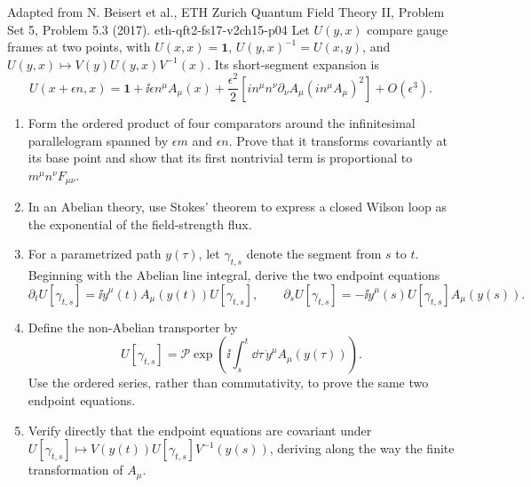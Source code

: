 \begin{enumerate}
  {Adapted from N. Beisert et al., ETH Zurich Quantum Field Theory II, Problem Set 5, Problem 5.3 (2017).}
  {eth-qft2-fs17-v2ch15-p04}
  Let \(U(y,x)\) compare gauge frames at two points, with
  \(U(x,x)=\mathbf{1}\), \(U(y,x)^{-1}=U(x,y)\), and
  \(U(y,x)\mapsto V(y)U(y,x)V^{-1}(x)\).  Its short-segment expansion is
  \[
    U(x+\epsilon n,x)=\mathbf{1}+\ii\epsilon n^\mu A_\mu(x)
      +\frac{\epsilon^2}{2}
       \left[in^\mu n^\nu\partial_\nu A_\mu
             (in^\mu A_\mu)^2\right]+O(\epsilon^3).
  \]
  \begin{enumerate}
    \item[(a)] Form the ordered product of four comparators around the
      infinitesimal parallelogram spanned by \(\epsilon m\) and
      \(\epsilon n\).  Prove that it transforms covariantly at its base
      point and show that its first nontrivial term is proportional to
      \(m^\mu n^\nu F_{\mu\nu}\).
    \item[(b)] In an Abelian theory, use Stokes' theorem to express a closed
      Wilson loop as the exponential of the field-strength flux.
    \item[(c)] For a parametrized path \(y(\tau)\), let
      \(\gamma_{t,s}\) denote the segment from \(s\) to \(t\).  Beginning
      with the Abelian line integral, derive the two endpoint equations
      \[
        \partial_tU[\gamma_{t,s}]
          =\ii\dot y^\mu(t)A_\mu(y(t))U[\gamma_{t,s}],
        \qquad
        \partial_sU[\gamma_{t,s}]
          =-\ii\dot y^\mu(s)U[\gamma_{t,s}]A_\mu(y(s)).
      \]
    \item[(d)] Define the non-Abelian transporter by
    \[
      U[\gamma_{t,s}]
        =\mathcal P\exp\left(\ii\int_s^t \dd\tau\,
          \dot y^\mu A_\mu(y(\tau))\right).
    \]
      Use the ordered series, rather than commutativity, to prove the same
      two endpoint equations.
    \item[(e)] Verify directly that the endpoint equations are covariant
      under
      \(U[\gamma_{t,s}]\mapsto
       V(y(t))U[\gamma_{t,s}]V^{-1}(y(s))\), deriving along the way the
      finite transformation of \(A_\mu\).
  \end{enumerate}


\end{enumerate}
